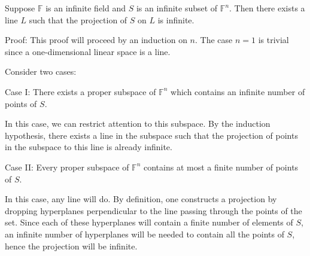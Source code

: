 \documentclass[12pt]{article}
\begin{document}
Suppose $\mathbb{F}$ is an infinite field and $S$ is an infinite subset of 
$\mathbb{F}^n$.  Then there exists a line $L$ such that the projection of $S$ 
on $L$ is infinite.

Proof:  This proof will proceed by an induction on $n$.  The case
$n=1$ is trivial since a one-dimensional linear space is a line.

Consider two cases:

Case I: There exists a proper subspace of $\mathbb{F}^n$
which contains an infinite number of points of $S$.

In this case, we can restrict attention to this subspace.  By the
induction hypothesis, there exists a line in the subspace such that
the projection of points in the subspace to this line is already
infinite.

Case II: Every proper subspace of $\mathbb{F}^n$ contains at most a
finite number of points of $S$.

In this case, any line will do.  By definition, one constructs a
projection by dropping hyperplanes perpendicular to the line passing
through the points of the set.  Since each of these hyperplanes will
contain a finite number of elements of $S$, an infinite number of
hyperplanes will be needed to contain all the points of $S$, hence the
projection will be infinite.
\end{document}
